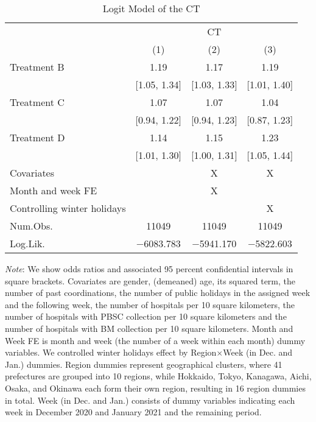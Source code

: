 \documentclass[12pt, a4paper]{article}
\begin{document}
\begin{table}[H]

\caption{\label{tab:test-logit}Logit Model of the CT}
\centering
\fontsize{8}{10}\selectfont
\begin{threeparttable}
\begin{tabular}[t]{lccc}
\toprule
\multicolumn{1}{c}{ } & \multicolumn{3}{c}{CT} \\
\cmidrule(l{3pt}r{3pt}){2-4}
  & (1) & (2) & (3)\\
\midrule
Treatment B & \num{1.19} & \num{1.17} & \num{1.19}\\
 & {}[\num{1.05}, \num{1.34}] & {}[\num{1.03}, \num{1.33}] & {}[\num{1.01}, \num{1.40}]\\
Treatment C & \num{1.07} & \num{1.07} & \num{1.04}\\
 & {}[\num{0.94}, \num{1.22}] & {}[\num{0.94}, \num{1.23}] & {}[\num{0.87}, \num{1.23}]\\
Treatment D & \num{1.14} & \num{1.15} & \num{1.23}\\
 & {}[\num{1.01}, \num{1.30}] & {}[\num{1.00}, \num{1.31}] & {}[\num{1.05}, \num{1.44}]\\
\midrule
Covariates &  & X & X\\
Month and week FE &  & X & \\
Controlling winter holidays &  &  & X\\
Num.Obs. & \num{11049} & \num{11049} & \num{11049}\\
Log.Lik. & \num{-6083.783} & \num{-5941.170} & \num{-5822.603}\\
\bottomrule
\end{tabular}
\begin{tablenotes}
\item \emph{Note}: We show odds ratios and associated 95 percent confidential intervals in square brackets. Covariates are gender, (demeaned) age, its squared term, the number of past coordinations, the number of public holidays in the assigned week and the following week, the number of hospitals per 10 square kilometers, the number of hospitals with PBSC collection per 10 square kilometers and the number of hospitals with BM collection per 10 square kilometers. Month and Week FE is month and week (the number of a week within each month) dummy variables. We controlled winter holidays effect by Region$\times$Week (in Dec. and Jan.) dummies. Region dummies represent geographical clusters, where 41 prefectures are grouped into 10 regions, while Hokkaido, Tokyo, Kanagawa, Aichi, Osaka, and Okinawa each form their own region, resulting in 16 region dummies in total. Week (in Dec. and Jan.) consists of dummy variables indicating each week in December 2020 and January 2021 and the remaining period.
\end{tablenotes}
\end{threeparttable}
\end{table}
\end{document}

